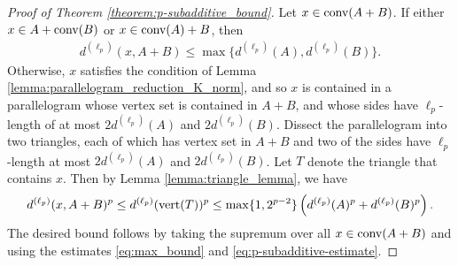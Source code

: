 \documentclass[11pt]{article}
\begin{document}
\begin{proof}[Proof of Theorem \ref{theorem:p-subadditive_bound}]
    Let $x\in \textup{conv}(A+B)$. If either $x\in A+\textup{conv}(B)$ or $x\in \textup{conv}(A)+B$, then 
    \begin{align}\label{eq:max_bound}
        d^{(\ell_p)}(x,A+B)\leq\max\{d^{(\ell_p)}(A),d^{(\ell_p)}(B)\}.
    \end{align}
    Otherwise, $x$ satisfies the condition of Lemma \ref{lemma:parallelogram_reduction_K_norm}, and so $x$ is contained in a parallelogram whose vertex set is contained in $A+B$, and whose sides have $\ell_p$-length of at most $2d^{(\ell_p)}(A)$ and $2d^{(\ell_p)}(B)$. Dissect the parallelogram into two triangles, each of which has vertex set in $A+B$ and two of the sides have $\ell_p$-length at most $2d^{(\ell_p)}(A)$ and $2d^{(\ell_p)}(B)$. Let $T$ denote the triangle that contains $x$. Then by Lemma \ref{lemma:triangle_lemma}, we have
    \begin{align}\label{eq:p-subadditive-estimate}
        d^{(\ell_p)}(x,A+B)^p\leq d^{(\ell_p)}(\textup{vert}(T))^p\leq \max\{1,2^{p-2}\}\left(d^{(\ell_p)}(A)^p+d^{(\ell_p)}(B)^p\right).
    \end{align}
    The desired bound follows by taking the supremum over all $x\in \textup{conv}(A+B)$ and using the estimates \eqref{eq:max_bound} and \eqref{eq:p-subadditive-estimate}.
\end{proof}
\end{document}
